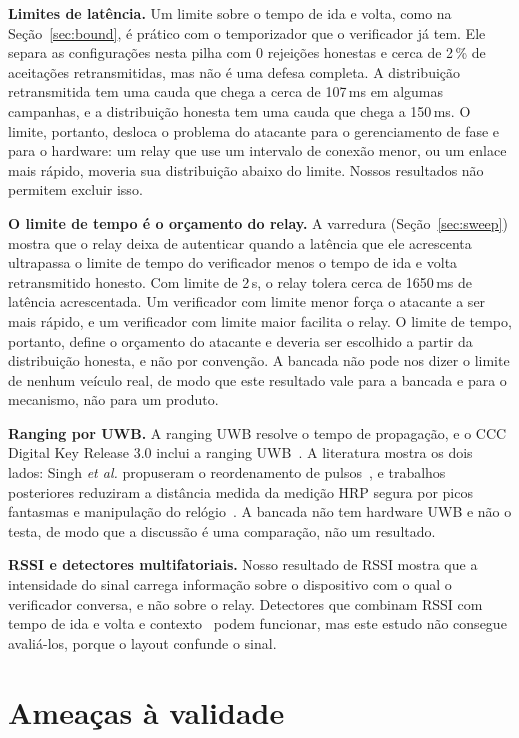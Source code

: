 \documentclass{ieeeaccess}
\begin{document}
\textbf{Limites de latência.} Um limite sobre o tempo de ida e volta, como na Seção~\ref{sec:bound}, é prático com o temporizador que o verificador já tem. Ele separa as configurações nesta pilha com 0 rejeições honestas e cerca de 2\,\% de aceitações retransmitidas, mas não é uma defesa completa. A distribuição retransmitida tem uma cauda que chega a cerca de 107\,ms em algumas campanhas, e a distribuição honesta tem uma cauda que chega a 150\,ms. O limite, portanto, desloca o problema do atacante para o gerenciamento de fase e para o hardware: um relay que use um intervalo de conexão menor, ou um enlace mais rápido, moveria sua distribuição abaixo do limite. Nossos resultados não permitem excluir isso.

\textbf{O limite de tempo é o orçamento do relay.} A varredura (Seção~\ref{sec:sweep}) mostra que o relay deixa de autenticar quando a latência que ele acrescenta ultrapassa o limite de tempo do verificador menos o tempo de ida e volta retransmitido honesto. Com limite de 2\,s, o relay tolera cerca de 1650\,ms de latência acrescentada. Um verificador com limite menor força o atacante a ser mais rápido, e um verificador com limite maior facilita o relay. O limite de tempo, portanto, define o orçamento do atacante e deveria ser escolhido a partir da distribuição honesta, e não por convenção. A bancada não pode nos dizer o limite de nenhum veículo real, de modo que este resultado vale para a bancada e para o mecanismo, não para um produto.

\textbf{Ranging por UWB.} A ranging UWB resolve o tempo de propagação, e o CCC Digital Key Release 3.0 inclui a ranging UWB~\cite{b9}. A literatura mostra os dois lados: Singh \emph{et al.} propuseram o reordenamento de pulsos~\cite{b5}, e trabalhos posteriores reduziram a distância medida da medição HRP segura por picos fantasmas e manipulação do relógio~\cite{b6,b7,b8}. A bancada não tem hardware UWB e não o testa, de modo que a discussão é uma comparação, não um resultado.

\textbf{RSSI e detectores multifatoriais.} Nosso resultado de RSSI mostra que a intensidade do sinal carrega informação sobre o dispositivo com o qual o verificador conversa, e não sobre o relay. Detectores que combinam RSSI com tempo de ida e volta e contexto~\cite{b22,b23} podem funcionar, mas este estudo não consegue avaliá-los, porque o layout confunde o sinal.

\section{Ameaças à validade}
\label{sec:threats}
\end{document}
